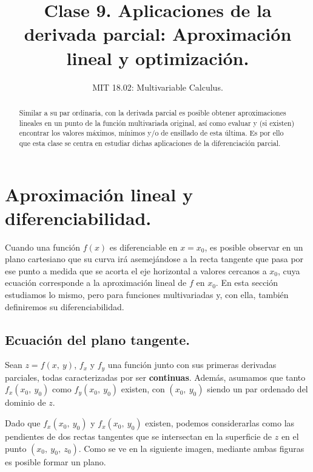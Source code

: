 \documentclass[12pt]{article}
\title{Clase 9. Aplicaciones de la derivada parcial: Aproximación lineal y optimización.}
\author{MIT 18.02: Multivariable Calculus.}
\date{}
\begin{document}


\maketitle

\begin{abstract}
\noindent Similar a su par ordinaria, con la derivada parcial es posible obtener aproximaciones lineales en un punto de la función multivariada original, así como evaluar y (si existen) encontrar los valores máximos, mínimos y/o de ensillado de esta última. Es por ello que esta clase se centra en estudiar dichas aplicaciones de la diferenciación parcial.
\end{abstract}


\section{Aproximación lineal y diferenciabilidad.}

Cuando una función $f(x)$ es diferenciable en $x = x_{0}$, es posible observar en un plano cartesiano que su curva irá asemejándose a la recta tangente que pasa por ese punto a medida que se acorta el eje horizontal a valores cercanos a $x_{0}$, cuya ecuación corresponde a la aproximación lineal de $f$ en $x_{0}$. En esta sección estudiamos lo mismo, pero para funciones multivariadas y, con ella, también definiremos su diferenciabilidad.

\subsection{Ecuación del plano tangente.}

Sean $z = f(x, \ y)$, $f_{x}$ y $f_{y}$ una función junto con sus primeras derivadas parciales, todas caracterizadas por ser \textbf{continuas}. Además, asumamos que tanto $f_{x}(x_{0}, \ y_{0})$ como $f_{y}(x_{0}, \ y_{0})$ existen, con $(x_{0}, \ y_{0})$ siendo un par ordenado del dominio de $z$.

Dado que $f_{x}(x_{0}, \ y_{0})$ y $f_{x}(x_{0}, \ y_{0})$ existen, podemos considerarlas como las pendientes de dos rectas tangentes que se intersectan en la superficie de $z$ en el punto $(x_{0}, \ y_{0}, \ z_{0})$. Como se ve en la siguiente imagen, mediante ambas figuras es posible formar un plano.

\newpage
\end{document}

